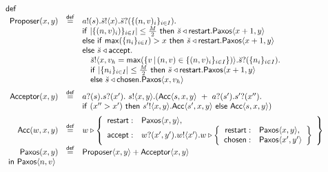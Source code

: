\noindent
	$
		\begin{array}{rcl}
								&& \Def{
								\\
								&&
								\begin{array}{rcl}
									\ProposerDef{x, y}
									&\defeq&
										\request{a}{s}
										\pout{\aggr s}{x}
										\pin{\aggr s}{\set{(n, v)_i}_{i \in I}}
									\\
									&&	\If\ |\set{(n, v)_i)}_{i \in I}| \leq \frac{M}{2}\ \Then\ \sel{\aggr s}{\restart} \PaxosVar{x+1, y}\\
									&&	\Else\ \If\ \Max{\set{n_i}_{i \in I}} > x\ \Then\ \sel{\aggr s}{\restart} \PaxosVar{x+1, y}\\
									&&	\Else\ \sel{\aggr s}{\acceptPhase}
										\\ && \quad \pout{\aggr s}{x, v_h = \Max{\set{v \,|\, (n, v) \in \set{(n, v)_i}_{i \in I}}}}
										\pin{\aggr s}{\set{n_i}_{i \in I}}
										\\ && \quad \If\ |\set{n_i}_{i \in I}| \leq \frac{M}{2}\ \Then\ \sel{\aggr s}{\restart}\PaxosVar{x+1, y}
										\\ && \quad \Else\ \sel{\aggr s}{\chosen} \PaxosVar{x, v_h}
									\\[2mm]
									\AcceptorDef{x, y}
									&\defeq&
										\accept{a}{s}
										\pin{s}{x'}\ \pout{s}{x, y} (\AccVar{s, x, y}\ \Sum\ \accept{a}{s'} \pin{s'}{x''}
										\\ && \If\ (x'' > x')\  \Then\ \pout{s'}{x, y} \AccVar{s', x, y}\ \Else\ \AccVar{s, x, y})

									\\[2mm]
									\AccDef{w, x, y}
									&\defeq&
										w \triangleright
										\left\{
											\begin{array}{rl}
												\restart:	& \PaxosVar{x, y},
												\\[0mm]
												\acceptPhase:	& \pin{w}{x', y'} \pout{w}{x'}
														w \triangleright
														\left\{
														\begin{array}{rl}
															\restart: & \PaxosVar{x, y},
															\\[0mm]
															\chosen: & \PaxosVar{x', y'}
														\end{array}
														\right\}
											\end{array}
										\right\}
									\\[2mm]
									\PaxosDef{x, y}
									&\defeq&
										\ProposerVar{x, y} \Sum \AcceptorVar{x, y}
								\end{array}
						\\		&& }{\PaxosVar{n, v}}
		\end{array}
	$
%

